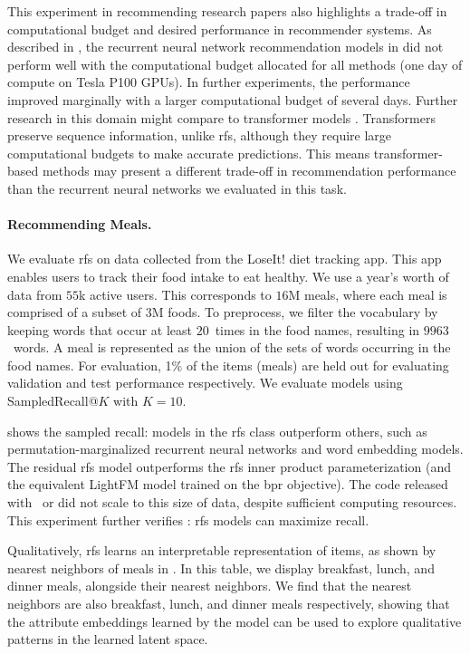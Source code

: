 This experiment in recommending research papers also highlights a trade-off in computational budget and desired performance in recommender systems. As described in , the recurrent neural network recommendation models in \citet{bansal2016ask-the-gru:} did not perform well with the computational budget allocated for all methods (one day of compute on Tesla P100 GPUs). In further experiments, the performance improved marginally with a larger computational budget of several days. Further research in this domain might compare to transformer models \citep{vaswani2017attention,devlin2019bert:}. Transformers preserve sequence information, unlike \gls{rfs}, although they require large computational budgets to make accurate predictions. This means transformer-based methods may present a different trade-off in recommendation performance than the recurrent neural networks we evaluated in this task.
\paragraph{Recommending Meals.} We evaluate \gls{rfs} on data collected from the LoseIt! diet tracking app. This app enables users to track their food intake to eat healthy. We use a year's worth of data from $55$k active users. This corresponds to $16$M meals, where each meal is comprised of a subset of $3$M foods. To preprocess, we filter the vocabulary by keeping words that occur at least $20$~times in the food names, resulting in $9963$~words. A meal is represented as the union of the sets of words occurring in the food names. For evaluation, 1\% of the items (meals) are held out for evaluating validation and test performance respectively. We evaluate models using SampledRecall@$K$ with $K=10$.


 shows the sampled recall: models in the \gls{rfs} class outperform others, such as permutation-marginalized recurrent neural networks and word embedding models. The residual \gls{rfs} model outperforms the \gls{rfs} inner product parameterization (and the equivalent LightFM model trained on the \gls{bpr} objective). The code released with~\citet{gopalan2014content-based} or \citet{wang2011collaborative} did not scale to this size of data, despite sufficient computing resources. This experiment further verifies : \gls{rfs} models can maximize recall.

Qualitatively, \gls{rfs} learns an interpretable representation of items, as
shown by nearest neighbors of meals in . In this table,
we display breakfast, lunch, and dinner meals, alongside their nearest
neighbors. We find that the nearest neighbors are also breakfast, lunch, and
dinner meals respectively, showing that the attribute embeddings learned by the
model can be used to explore qualitative patterns in the learned latent space.
